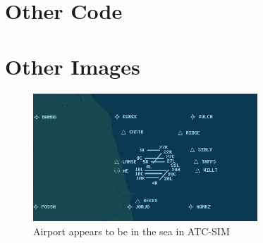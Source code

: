\documentclass{article}
\begin{document}
\begin{appendices}
\section{Other Code}\label{appendix:otherfunctions}


\section{Other Images}\label{appendix:otherimages}
\begin{figure}[H]
\centering
\includegraphics[width=0.75\textwidth]{existing_solutions/airportinseaatcsim.png}
\caption{\label{fig:airportinseaatcsim}Airport appears to be in the sea in ATC-SIM}
\end{figure}
\end{appendices}
\end{document}
